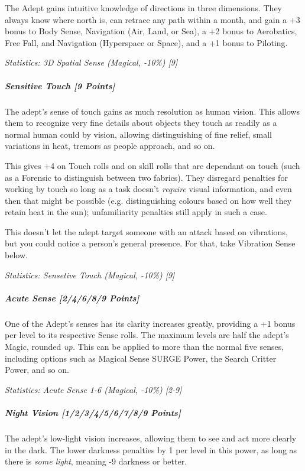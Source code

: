 \begin{multicols*}{3}
		The Adept gains intuitive knowledge of directions in three dimensions. They always know where north is, can retrace any path within a month, and gain a +3 bonus to Body Sense, Navigation (Air, Land, or Sea), a +2 bonus to Aerobatics, Free Fall, and Navigation (Hyperspace or Space), and a +1 bonus to Piloting.
		
		\textcolor{OliveGreen}{\textit{Statistics: 3D Spatial Sense (Magical, -10\%) [9]}}
			
	\subparagraph{Sensitive Touch [9 Points]}
	
		The adept's sense of touch gains as much resolution as human vision. This allows them to recognize very fine details about objects they touch as readily as a normal human could by vision, allowing distinguishing of fine relief, small variations in heat, tremors as people approach, and so on. 
		
		This gives +4 on Touch rolls and on skill rolls that are dependant on touch (such as a Forensic to distinguish between two fabrics). They disregard penalties for working by touch so long as a task doesn't \textit{require} visual information, and even then that might be possible (e.g. distinguishing colours based on how well they retain heat in the sun); unfamiliarity penalties still apply in such a case. 
		
		This doesn't let the adept target someone with an attack based on vibrations, but you could notice a person's general presence. For that, take Vibration Sense below.
			
		\textcolor{OliveGreen}{\textit{Statistics: Sensetive Touch (Magical, -10\%) [9] }}
			
	\subparagraph{Acute Sense [2/4/6/8/9 Points]}
	
		One of the Adept's senses has its clarity increases greatly, providing a +1 bonus per level to its respective Sense rolls. The maximum levels are half the adept's Magic, rounded \textit{up.} This can be applied to more than the normal five senses, including options such as Magical Sense SURGE Power, the Search Critter Power, and so on.
		
		\textcolor{OliveGreen}{\textit{Statistics: Acute Sense 1-6 (Magical, -10\%) [2-9]}}
				
	\subparagraph{Night Vision [1/2/3/4/5/6/7/8/9 Points]}
	
		The adept's low-light vision increases, allowing them to see and act more clearly in the dark. The lower darkness penalties by 1 per level in this power, as long as there is \textit{some light}, meaning -9 darkness or better.
		

\end{multicols*}
